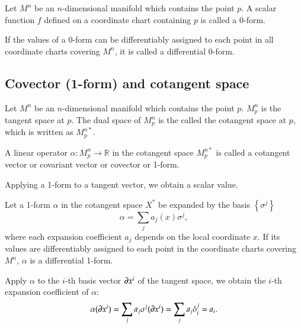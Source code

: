 \documentclass[11pt, a4paper]{book}
\begin{document}
\begin{Definition}[0-form]
  \label{def:0-form}
  Let $M^n$ be an $n$-dimensional manifold which contains the point $p$. A scalar function
  $f$ defined on a coordinate chart containing $p$ is called a 0-form.
\end{Definition}

\begin{Definition}
  If the values of a 0-form can be differentiably assigned to each point in all coordinate
  charts covering $M^n$, it is called a differential 0-form.
\end{Definition}

\subsection{Covector (1-form) and cotangent space}
\label{sec:1-form}

\begin{Definition}
  Let $M^n$ be an $n$-dimensional manifold which contains the point $p$. $M_p^n$ is the
  tangent space at $p$. The dual space of $M_p^n$ is the called the cotangent space at
  $p$, which is written as $M_p^{n*}$.
\end{Definition}

\begin{Definition}
  A linear operator $\alpha: M_p^n \rightarrow \mathbb{R}$ in the cotangent space
  $M_p^{n*}$ is called a cotangent vector or covariant vector or covector or 1-form.
\end{Definition}
Applying a 1-form to a tangent vector, we obtain a scalar value.

\begin{Definition}
  Let a 1-form $\alpha$ in the cotangent space $X^{*}$ be expanded by the basis $\left\{
    \sigma^j \right\}$
  \begin{equation*}
    \alpha = \sum_j a_j(x) \sigma^j,
  \end{equation*}
  where each expansion coefficient $a_j$ depends on the local coordinate $x$. If its
  values are differentiably assigned to each point in the coordinate charts covering
  $M^n$, $\alpha$ is a differential 1-form.
\end{Definition}

Apply $\alpha$ to the $i$-th basis vector $\boldsymbol{\partial}x^i$ of the tangent space, we
obtain the $i$-th expansion coefficient of $\alpha$:
\begin{equation}
  \label{eq:apply-1-form-to-basis}
  \alpha(\boldsymbol{\partial}x^i) = \sum_j a_j \sigma^j(\boldsymbol{\partial}x^i) = \sum_j a_j
  \delta^j_i = a_i.
\end{equation}
\end{document}
